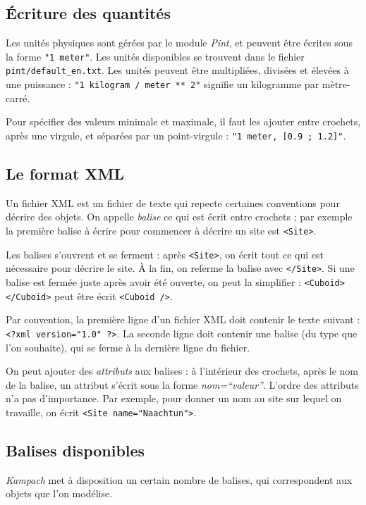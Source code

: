 \documentclass{article}
\begin{document}
\subsection{Écriture des quantités}
Les unités physiques sont gérées par le module \textit{Pint}, et peuvent être écrites sous la forme \texttt{"1 meter"}. Les unités disponibles se trouvent dans le fichier \texttt{pint/default\_en.txt}. Les unités peuvent être multipliées, divisées et élevées à une puissance : \texttt{"1 kilogram / meter ** 2"} signifie un kilogramme par mètre-carré.

Pour spécifier des valeurs minimale et maximale, il faut les ajouter entre crochets, après une virgule, et séparées par un point-virgule : \texttt{"1 meter, [0.9 ; 1.2]"}.

\subsection{Le format XML}
Un fichier XML est un fichier de texte qui repecte certaines conventions pour décrire des objets. On appelle \textit{balise} ce qui est écrit entre crochets ; par exemple la première balise à écrire pour commencer à décrire un site est \texttt{<Site>}.

Les balises s'ouvrent et se ferment : après \texttt{<Site>}, on écrit tout ce qui est nécessaire pour décrire le site. À la fin, on referme la balise avec \texttt{</Site>}. Si une balise est fermée juste après avoir été ouverte, on peut la simplifier : \texttt{<Cuboid></Cuboid>} peut être écrit \texttt{<Cuboid />}.

Par convention, la première ligne d'un fichier XML doit contenir le texte suivant : \texttt{<?xml version="1.0" ?>}. La seconde ligne doit contenir une balise (du type que l'on souhaite), qui se ferme à la dernière ligne du fichier.

On peut ajouter des \textit{attributs} aux balises : à l'intérieur des crochets, après le nom de la balise, un attribut s'écrit sous la forme \textit{nom=``valeur''}. L'ordre des attributs n'a pas d'importance. Par exemple, pour donner un nom au site sur lequel on travaille, on écrit \texttt{<Site name="Naachtun">}.

\subsection{Balises disponibles}
\textit{Kampach} met à disposition un certain nombre de balises, qui correspondent aux objets que l'on modélise.
\end{document}
